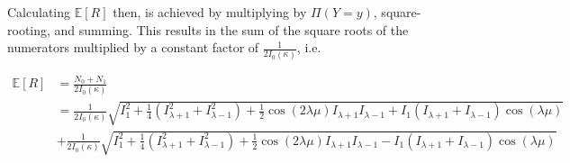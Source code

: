 \documentclass[]{report}
\begin{document}
Calculating $\mathbb{E}[R]$ then, is achieved by multiplying by  $\Pi(Y = y)$, square-rooting, and summing. This results in the sum of the square roots of the numerators multiplied by a constant factor of $\frac{1}{2 I_0(\kappa)}$, i.e.

\begin{align*}
	\mathbb{E}[R] &= \frac{N_0 + N_1}{2 I_0(\kappa)} \\
		      &= \frac{1}{2 I_0(\kappa) } \sqrt{I_1^2 + \frac{1}{4} \left( I_{\lambda + 1}^{2} + I_{\lambda - 1}^2 \right)  + \frac{1}{2}\cos(2 \lambda \mu) I_{\lambda +1} I_{\lambda - 1} + I_1 \left( I_{\lambda + 1} + I_{\lambda -1 } \right) \cos (\lambda \mu) } \\
		      & + \frac{1}{2 I_0(\kappa) } \sqrt{I_1^2 + \frac{1}{4} \left( I_{\lambda + 1}^{2} + I_{\lambda - 1}^2 \right)  + \frac{1}{2}\cos(2 \lambda \mu) I_{\lambda +1} I_{\lambda - 1} - I_1 \left( I_{\lambda + 1} + I_{\lambda -1 } \right) \cos (\lambda \mu) }
\end{align*}
\end{document}
